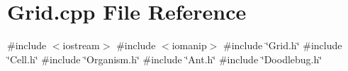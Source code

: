 \section{Grid.\+cpp File Reference}
\label{Grid_8cpp}
{\ttfamily \#include $<$iostream$>$}\newline
{\ttfamily \#include $<$iomanip$>$}\newline
{\ttfamily \#include \char`\"{}Grid.\+h\char`\"{}}\newline
{\ttfamily \#include \char`\"{}Cell.\+h\char`\"{}}\newline
{\ttfamily \#include \char`\"{}Organism.\+h\char`\"{}}\newline
{\ttfamily \#include \char`\"{}Ant.\+h\char`\"{}}\newline
{\ttfamily \#include \char`\"{}Doodlebug.\+h\char`\"{}}\newline
